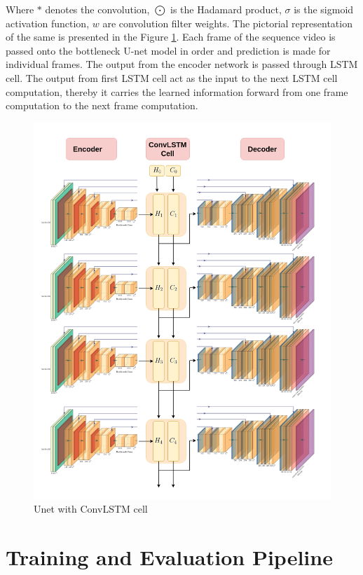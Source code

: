     Where $*$ denotes the convolution, $\bigodot$ is the Hadamard product, $\sigma$ is the sigmoid activation function, $w$ are convolution filter weights. The pictorial representation of the same is presented in the Figure \ref{fig:unet_lstm}. Each frame of the sequence video is passed onto the bottleneck U-net model in order and prediction is made for individual frames. The output from the encoder network is passed through LSTM cell. The output from first LSTM cell act as the input to the next LSTM cell computation, thereby it carries the learned information forward from one frame computation to the next frame computation.   
    
	\begin{figure}
		\centering
		\includegraphics[width=14cm]{images/unet_lstm.png}
		\caption{Unet with ConvLSTM cell}
		\label{fig:unet_lstm}
	\end{figure}     
        
    \section{Training and Evaluation Pipeline}
    
